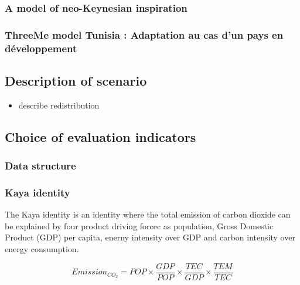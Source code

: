 \documentclass[
]{article}
\providecommand{\tightlist}{%
  \setlength{\itemsep}{0pt}\setlength{\parskip}{0pt}}
\begin{document}
\hypertarget{a-model-of-neo-keynesian-inspiration}{%
\subsubsection{A model of neo-Keynesian
inspiration}\label{a-model-of-neo-keynesian-inspiration}}

\hypertarget{threeme-model-tunisia-adaptation-au-cas-dun-pays-en-duxe9veloppement}{%
\subsubsection{ThreeMe model Tunisia : Adaptation au cas d'un pays en
développement}\label{threeme-model-tunisia-adaptation-au-cas-dun-pays-en-duxe9veloppement}}

\hypertarget{description-of-scenario}{%
\subsection{Description of scenario}\label{description-of-scenario}}

\begin{itemize}
\tightlist
\item
  describe redistribution
\end{itemize}

\hypertarget{choice-of-evaluation-indicators}{%
\subsection{Choice of evaluation
indicators}\label{choice-of-evaluation-indicators}}

\hypertarget{data-structure}{%
\subsubsection{Data structure}\label{data-structure}}

\hypertarget{kaya-identity}{%
\subsubsection{Kaya identity}\label{kaya-identity}}

The Kaya identity is an identity where the total emission of carbon
dioxide can be explained by four product driving forcec as population,
Gross Domestic Product (GDP) per capita, enerny intensity over GDP and
carbon intensity over energy consumption. \textcite{gazàef2016}

\[ Emission_{CO_2} = POP \times\frac{GDP}{POP} \times \frac{TEC}{GDP} \times \frac{TEM}{TEC}\]
\end{document}
